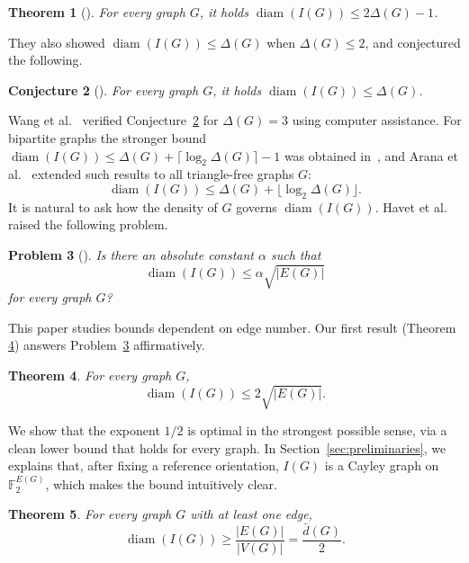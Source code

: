 \documentclass[11pt]{article}
\newtheorem{theorem}{Theorem}[section]
\newtheorem{conjecture}[theorem]{Conjecture}
\newtheorem{problem}[theorem]{Problem}
\theoremstyle{remark}
\DeclareMathOperator{\diam}{diam}
\newcommand{\F}{\mathbb{F}}
\begin{document}
\begin{theorem}[{\cite{HavetHorschRambaud}}]\label{thm:HHR}
For every graph $G$, it holds  $\diam(I(G))\le 2\Delta(G)-1$.
 
\end{theorem}

They also showed $\diam(I(G))\le \Delta(G)$ when $\Delta(G)\le2$, and conjectured the following.

\begin{conjecture}[{\cite{HavetHorschRambaud}}]\label{conj:Delta}
For every graph $G$, it holds
 $\diam(I(G))\le \Delta(G)$.

\end{conjecture}

Wang et al.~\cite{WangWangYangLu} verified Conjecture~\ref{conj:Delta} for $\Delta(G)=3$ using computer assistance.
For bipartite graphs the stronger bound
$\diam(I(G))\le \Delta(G)+\lceil\log_2\Delta(G)\rceil-1$
was obtained in~\cite{HavetHorschRambaud}, and Arana et al.~\cite{AranaEtAl} extended such  results to all triangle-free graphs $G$: 
\begin{equation}\label{eq:triangle-free-delta-bound}
  \diam(I(G))\le \Delta(G)+\lfloor\log_2\Delta(G)\rfloor.
\end{equation}
It is natural to ask how the density of $G$ governs $\diam(I(G))$.
Havet et al.~\cite{HavetHorschRambaud} raised the following problem.

\begin{problem}[{\cite{HavetHorschRambaud}}]\label{prob:edge-bound}
Is there an absolute constant $\alpha$ such that
\[
  \diam(I(G))\le \alpha\sqrt{|E(G)|}
\]
for every graph $G$?
\end{problem}
 

This paper studies bounds dependent on edge number. 
Our first result (Theorem \ref{thm:edge-upper}) answers Problem~\ref{prob:edge-bound} affirmatively.

\begin{theorem}\label{thm:edge-upper}
For every graph $G$,
\[
  \diam(I(G))\le 2\sqrt{|E(G)|}.
\]
\end{theorem}

We show that the exponent $1/2$ is optimal in the strongest possible sense, via a clean lower bound that holds for every graph.
In Section~\ref{sec:preliminaries}, we   explains that, after fixing a reference orientation, $I(G)$ is a Cayley graph on $\F_2^{E(G)}$, which makes the bound intuitively clear.

\begin{theorem}\label{thm:lower-bound}
For every graph $G$ with at least one edge,
\[
  \diam(I(G))\ge \frac{|E(G)|}{|V(G)|}=\frac{\bar d(G)}2 .
\]
\end{theorem}
\end{document}
